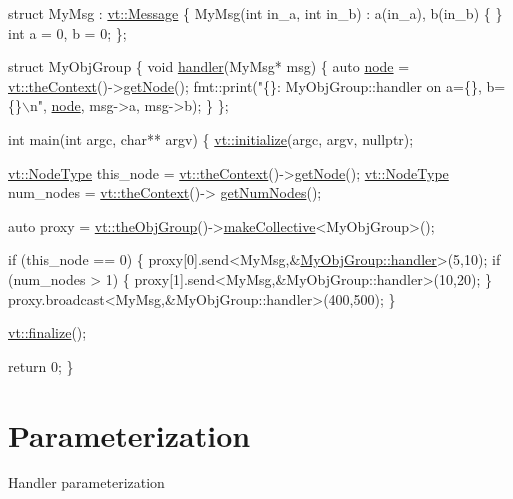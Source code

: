\begin{DoxyCodeInclude}
\textcolor{keyword}{struct }MyMsg : \hyperlink{structvt_1_1messaging_1_1_active_msg}{vt::Message} \{
  MyMsg(\textcolor{keywordtype}{int} in\_a, \textcolor{keywordtype}{int} in\_b) : a(in\_a), b(in\_b) \{ \}
  \textcolor{keywordtype}{int} a = 0, b = 0;
\};

\textcolor{keyword}{struct }MyObjGroup \{
  \textcolor{keywordtype}{void} \hyperlink{namespacevt_1_1config_a6bd1d6215bda0d8ca02811798399f689a82a0081a94d5c5dfd18b0b3f7eca64b7}{handler}(MyMsg* msg) \{
    \textcolor{keyword}{auto} \hyperlink{namespacevt_1_1config_a46e57c33bee1b9f1fa95455af86d80e0a576033c81e2ddd03d721ecef3b1b3f81}{node} = \hyperlink{namespacevt_a26551fe0e6e6a1371111df5b12c7e92c}{vt::theContext}()->\hyperlink{structvt_1_1ctx_1_1_context_a0d52c263ce8516546a67443d9a86fa5f}{getNode}();
    fmt::print(\textcolor{stringliteral}{"\{\}: MyObjGroup::handler on a=\{\}, b=\{\}\(\backslash\)n"}, \hyperlink{namespacevt_1_1config_a46e57c33bee1b9f1fa95455af86d80e0a576033c81e2ddd03d721ecef3b1b3f81}{node}, msg->a, msg->b);
  \}
\};

\textcolor{keywordtype}{int} main(\textcolor{keywordtype}{int} argc, \textcolor{keywordtype}{char}** argv) \{
  \hyperlink{namespacevt_aaa266774ea8339c58be0202b00fafa62}{vt::initialize}(argc, argv, \textcolor{keyword}{nullptr});

  \hyperlink{namespacevt_a866da9d0efc19c0a1ce79e9e492f47e2}{vt::NodeType} this\_node = \hyperlink{namespacevt_a26551fe0e6e6a1371111df5b12c7e92c}{vt::theContext}()->\hyperlink{structvt_1_1ctx_1_1_context_a0d52c263ce8516546a67443d9a86fa5f}{getNode}();
  \hyperlink{namespacevt_a866da9d0efc19c0a1ce79e9e492f47e2}{vt::NodeType} num\_nodes = \hyperlink{namespacevt_a26551fe0e6e6a1371111df5b12c7e92c}{vt::theContext}()->
      \hyperlink{structvt_1_1ctx_1_1_context_a7f41071aadf6d5fa9e1b6c703c5ff19d}{getNumNodes}();

  \textcolor{keyword}{auto} proxy = \hyperlink{namespacevt_a833f0115b692f578167cbd88e30d39c5}{vt::theObjGroup}()->\hyperlink{structvt_1_1objgroup_1_1_obj_group_manager_a651c44a47c6bcdc9f1b6c9e857fa03f2}{makeCollective}<MyObjGroup>();

  \textcolor{keywordflow}{if} (this\_node == 0) \{
    proxy[0].send<MyMsg,&\hyperlink{namespacevt_1_1config_a6bd1d6215bda0d8ca02811798399f689a82a0081a94d5c5dfd18b0b3f7eca64b7}{MyObjGroup::handler}>(5,10);
    \textcolor{keywordflow}{if} (num\_nodes > 1) \{
      proxy[1].send<MyMsg,&MyObjGroup::handler>(10,20);
    \}
    proxy.broadcast<MyMsg,&MyObjGroup::handler>(400,500);
  \}

  \hyperlink{namespacevt_a540d90dbd6e97b69f1dcbc9ee9314cff}{vt::finalize}();

  \textcolor{keywordflow}{return} 0;
\}
\end{DoxyCodeInclude}
\hypertarget{param}{}\section{Parameterization}\label{param}
Handler parameterization

